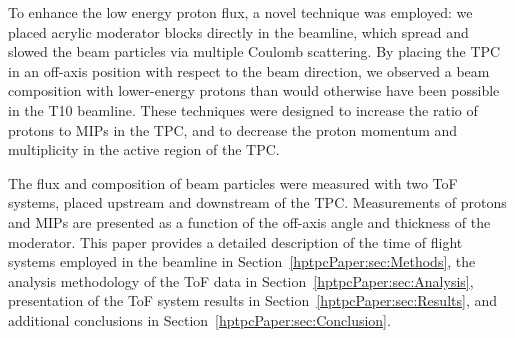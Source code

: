 To enhance the low energy proton flux, a novel technique was employed:
we placed acrylic moderator blocks directly in the beamline, which spread and slowed the beam particles via multiple Coulomb scattering.
By placing the TPC in an off-axis position with respect to the beam direction, we observed a beam composition with lower-energy protons than would otherwise have been possible in the T10 beamline.
These techniques were designed to increase the ratio of protons to MIPs in the TPC, and to decrease the proton momentum and multiplicity in the active region of the TPC.

The flux and composition of beam particles were measured with two ToF systems, placed upstream and downstream of the TPC.
Measurements of protons and MIPs are presented as a function of the off-axis angle and thickness of the moderator.
This paper provides a detailed description of the time of flight systems employed in the beamline in Section~\ref{hptpcPaper:sec:Methods}, the analysis methodology of the ToF data in Section~\ref{hptpcPaper:sec:Analysis}, presentation of the ToF system results in Section~\ref{hptpcPaper:sec:Results}, and additional conclusions in Section~\ref{hptpcPaper:sec:Conclusion}.
